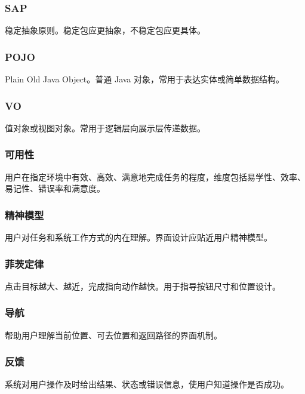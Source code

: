 \documentclass[UTF8,zihao=-4]{ctexart}
\begin{document}
\subsubsection*{SAP}


稳定抽象原则。稳定包应更抽象，不稳定包应更具体。


\subsubsection*{POJO}


Plain Old Java Object。普通 Java 对象，常用于表达实体或简单数据结构。


\subsubsection*{VO}


值对象或视图对象。常用于逻辑层向展示层传递数据。


\subsubsection*{可用性}


用户在指定环境中有效、高效、满意地完成任务的程度，维度包括易学性、效率、易记性、错误率和满意度。


\subsubsection*{精神模型}


用户对任务和系统工作方式的内在理解。界面设计应贴近用户精神模型。


\subsubsection*{菲茨定律}


点击目标越大、越近，完成指向动作越快。用于指导按钮尺寸和位置设计。


\subsubsection*{导航}


帮助用户理解当前位置、可去位置和返回路径的界面机制。


\subsubsection*{反馈}


系统对用户操作及时给出结果、状态或错误信息，使用户知道操作是否成功。
\end{document}
